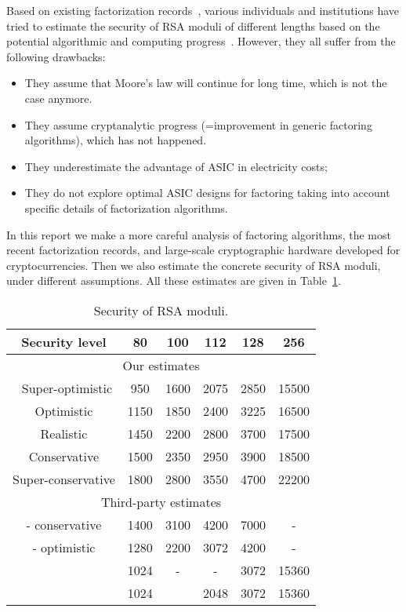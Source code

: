 \documentclass[a4paper]{article}
\begin{document}
Based on existing factorization records~\cite{DBLP:conf/eurocrypt/CavallarDLLMMRAGGLMMMPPZ00,DBLP:conf/crypto/KleinjungAFLTBGKMORTZ10,DBLP:journals/iacr/BaiTZ12,factor795}, various individuals and institutions have tried to estimate the security of RSA moduli of different lengths based on the potential algorithmic and computing progress~\cite{lenstra2001selecting,DBLP:conf/asiacrypt/LenstraTSKDHL03,lenstra2004key,abdalla2016algorithms,barker2016nist}. However, they all suffer from the following drawbacks:
\begin{itemize}
    \item They assume that Moore's law will continue for long time, which is not the case anymore.
    \item They assume cryptanalytic progress (=improvement in generic factoring algorithms), which has not happened.
    \item They underestimate the advantage of ASIC in electricity costs;
    \item They do not explore optimal ASIC designs for factoring taking into account specific details of factorization algorithms.
\end{itemize}
In this report we make a more careful analysis of factoring algorithms, the most recent factorization records, and large-scale cryptographic hardware developed for cryptocurrencies. Then we also estimate the concrete security of RSA moduli, under different assumptions. All these estimates are given in Table~\ref{tab:sec}.

\begin{table}[t]
    \centering
    \begin{tabular}{|c|c|c|c|c|c|}
        \hline 
        Security level &80 & 100 & 112 & 128 & 256   \\
        \hline\hline
        \multicolumn{6}{|c|}{Our estimates}\\\hline\
        Super-optimistic & 950 & 1600 & 2075 & 2850 &15500\\
        Optimistic& 1150 & 1850 & 2400 & 3225 & 16500\\
        Realistic & 1450 &2200 & 2800& 3700 & 17500\\
        Conservative & 1500 & 2350&2950& 3900 & 18500\\
        Super-conservative& 1800 & 2800 &3550& 4700 & 22200\\         \hline\hline
        \multicolumn{6}{|c|}{Third-party estimates}\\\hline
        \cite{lenstra2004key} - conservative & 1400 & 3100 & 4200 & 7000&-\\
        \cite{lenstra2004key} - optimistic & 1280 & 2200 & 3072 & 4200&-\\
        \cite{abdalla2016algorithms} & 1024 &-&-&3072 & 15360\\
        \cite{barker2016nist}&1024 &&2048&3072 &15360\\\hline
    \end{tabular}
    \caption{Security of RSA moduli.}
    \label{tab:sec}
\end{table}
\end{document}
